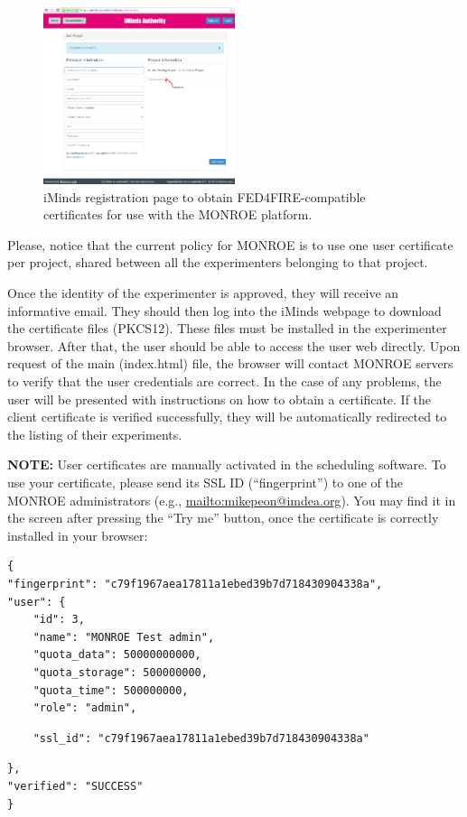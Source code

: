 \documentclass[a4paper,10pt]{article}
\newcommand{\VerbatimFont}{\footnotesize}
\newcommand{\monroe}{MONROE}
\begin{document}
\begin{figure}[tp]
	\centering
	\includegraphics[width=0.5\textwidth]{iMindsCreateAccount2.png}
	\caption{iMinds registration page to obtain FED4FIRE-compatible certificates for use with the \monroe{} platform.}
	\label{fig:iMindsCreateAccount}
\end{figure}

Please, notice that the current policy for \monroe{} is to use one user certificate per project, shared between all the experimenters belonging to that project.

Once the identity of the experimenter is approved, they will receive an informative email.
They should then log into the iMinds webpage to download the certificate files (PKCS12).
These files must be installed in the experimenter browser.
After that, the user should be able to access the user web directly.
Upon request of the main (index.html) file, the browser will contact \monroe{} servers to verify that the user credentials are correct.
In the case of any problems, the user will be presented with instructions on how to obtain a certificate.
If the client certificate is verified successfully, they will be automatically redirected to the listing of their experiments.

\textbf{NOTE:} User certificates are manually activated in the scheduling software.
To use your certificate, please send its SSL ID (``fingerprint'') to one of the \monroe{} administrators (e.g., \url{mailto:mikepeon@imdea.org}).
You may find it in the screen after pressing the ``Try me'' button, once the certificate is correctly installed in your browser:
{\VerbatimFont\begin{verbatim}
{
"fingerprint": "c79f1967aea17811a1ebed39b7d718430904338a",
"user": {
    "id": 3,
    "name": "MONROE Test admin",
    "quota_data": 50000000000,
    "quota_storage": 500000000,
    "quota_time": 500000000,
    "role": "admin",
\end{verbatim}
\color{red}
\vspace{-0.7cm}
\begin{verbatim}
    "ssl_id": "c79f1967aea17811a1ebed39b7d718430904338a"
\end{verbatim}
\color{black}
\vspace{-0.7cm}
\begin{verbatim}
},
"verified": "SUCCESS"
}
\end{verbatim}}
\end{document}
